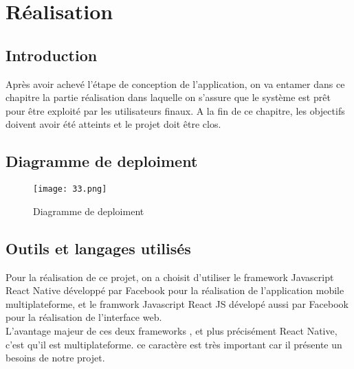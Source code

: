 
\setcounter{chapter}{2}
\chapter{Réalisation}
\minitoc %
\graphicspath{{Chapitre3/figures/}}

\pagestyle{fancy}
\fancyhf{}
\fancyhead[R]{\bfseries\rightmark}
\fancyfoot[R]{\thepage}
\renewcommand{\headrulewidth}{0.5pt}
\renewcommand{\footrulewidth}{0pt}
\renewcommand{\chaptermark}[1]{\markboth{\MakeUppercase{\chaptername~\thechapter. #1 }}{}}
\renewcommand{\sectionmark}[1]{\markright{\thechapter.\thesection~ #1}}

\begin{spacing}{1.2}

\section*{Introduction}
Après  avoir  achevé  l’étape  de  conception  de  l’application,  on  va  entamer  dans  ce  chapitre  la  partie  réalisation  dans  laquelle  on  s’assure  que  le  système  est prêt pour être exploité par les utilisateurs finaux. A la fin de ce chapitre, les objectifs doivent avoir été atteints et le projet doit être clos.


\section{Diagramme de deploiment}

\begin{figure}[H]\centering
\texttt{[image: 33.png]}
\caption{Diagramme de deploiment}
\label{fig:fig3}
\end{figure} 

\section{Outils et langages utilisés}
Pour la réalisation de ce projet, on a choisit d'utiliser le framework Javascript React Native développé par Facebook pour la  réalisation de l'application mobile multiplateforme, et le framwork Javascript React JS dévelopé aussi par Facebook pour la réalisation de l'interface web. \\
L'avantage majeur de ces deux frameworks , et plus précisément React Native, c'est qu'il est multiplateforme.
ce caractère est très important car il présente un besoins de notre projet. 


\end{spacing}

